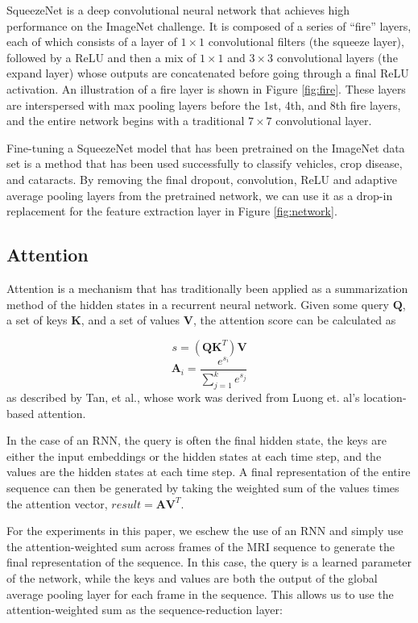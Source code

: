 \documentclass[10pt,twocolumn,letterpaper]{article}
\begin{document}
SqueezeNet is a deep convolutional neural network that achieves high performance on the ImageNet challenge. It is composed of a series of ``fire'' layers, each of which consists of a layer of $1 \times 1$ convolutional filters (the squeeze layer), followed by a ReLU and then a mix of $1 \times 1$ and $3 \times 3$ convolutional layers (the expand layer) whose outputs are concatenated before going through a final ReLU activation. An illustration of a fire layer is shown in Figure \ref{fig:fire}. These layers are interspersed with max pooling layers before the 1st, 4th, and 8th fire layers, and the entire network begins with a traditional $7 \times 7$ convolutional layer.

Fine-tuning a SqueezeNet model that has been pretrained on the ImageNet data set is a method that has been used successfully to classify vehicles\cite{agoes2017fine}, crop disease\cite{durmucs2017disease}, and cataracts\cite{qian2018machine}. By removing the final dropout, convolution, ReLU and adaptive average pooling layers from the pretrained network, we can use it as a drop-in replacement for the feature extraction layer in Figure \ref{fig:network}.

\subsection{Attention}
Attention is a mechanism that has traditionally been applied as a summarization method of the hidden states in a recurrent neural network. Given some query $\textbf{Q}$, a set of keys $\textbf{K}$, and a set of values $\textbf{V}$, the attention score can be calculated as

$$s = (\textbf{Q}\textbf{K}^T)\textbf{V}$$
$$\textbf{A}_i = \frac{e^{s_i}}{\sum_{j=1}^k e^{s_j}}$$
 as described by Tan, et al.\cite{tan2018deep}, whose work was derived from Luong et. al's location-based attention\cite{luong2015effective}.

In the case of an RNN, the query is often the final hidden state, the keys are either the input embeddings or the hidden states at each time step, and the values are the hidden states at each time step. A final representation of the entire sequence can then be generated by taking the weighted sum of the values times the attention vector, $result = \textbf{A} \textbf{V}^T$.

For the experiments in this paper, we eschew the use of an RNN and simply use the attention-weighted sum across frames of the MRI sequence to generate the final representation of the sequence. In this case, the query is a learned parameter of the network, while the keys and values are both the output of the global average pooling layer for each frame in the sequence. This allows us to use the attention-weighted sum as the sequence-reduction layer:
\end{document}

